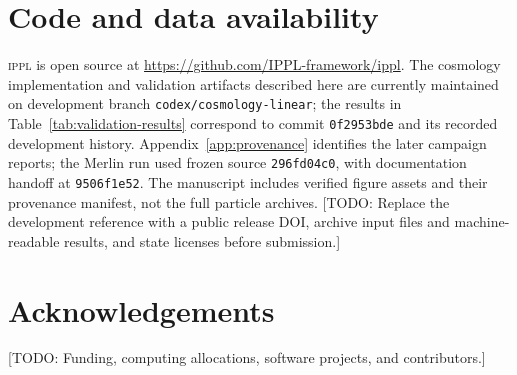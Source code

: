 \documentclass[11pt]{article}
\newcommand{\IPPL}{\textnormal{\textsc{ippl}}\xspace}
\newcommand{\todo}[1]{\textcolor{red!70!black}{[TODO: #1]}}
\begin{document}
\section*{Code and data availability}

\IPPL is open source at \url{https://github.com/IPPL-framework/ippl}.  The
cosmology implementation and validation artifacts described here are currently
maintained on development branch \texttt{codex/cosmology-linear}; the results in
Table~\ref{tab:validation-results} correspond to commit \texttt{0f2953bde} and
its recorded development history.  Appendix~\ref{app:provenance} identifies the
later campaign reports; the Merlin run used frozen source \texttt{296fd04c0},
with documentation handoff at \texttt{9506f1e52}.  The manuscript includes
verified figure assets and their provenance manifest, not the full particle
archives.  \todo{Replace the development reference with a
public release DOI, archive input files and machine-readable results, and state
licenses before submission.}

\section*{Acknowledgements}
\todo{Funding, computing allocations, software projects, and contributors.}

\clearpage
\appendix
{}


\clearpage


\end{document}
